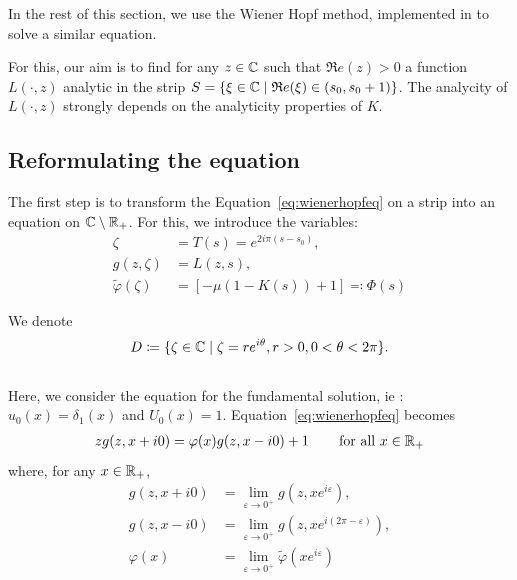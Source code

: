 \documentclass[11pt]{amsart}
\renewcommand{\Re}{\mathfrak{R}e}
\begin{document}
In the rest of this section, we use the Wiener Hopf method, implemented in \cite{escobedo2007fundamental} to solve a similar equation. 
\medskip

For this, our aim is to find for any $z \in \mathbb{C}$ such that $\Re(z) > 0$ a function $L(\cdot,z)$ analytic in the strip $S = \{\xi \in \CC \mid \Re(\xi) \in (s_0, s_0+1)\}$. 
The analycity of $L(\cdot,z)$ strongly depends on the analyticity properties of $K$.\\



\subsection{Reformulating the equation}

The first step is to transform the Equation~\eqref{eq:wienerhopfeq} on a strip into an equation on $\mathbb{C} \setminus \mathbb{R}_+$. For this, we introduce the variables:
    \begin{align}
        \zeta &= T(s) = e^{2i\pi(s-s_0)},\\
        g(z,\zeta) &= L(z,s), \\
        \tilde \varphi(\zeta) &= \left[- \mu (1-K(s)) + 1\right] \eqqcolon 
        \Phi(s)
    \end{align}

We denote 
\begin{equation}\label{def:D}
D \coloneqq \{ \zeta \in \mathbb{C} \mid \zeta = re^{i\theta}, r > 0, 0 < \theta < 2\pi \}.
\end{equation}\\

Here, we consider the equation for the fundamental solution, ie : $u_0(x) = \delta_1(x)$ and $U_0(x) = 1$. Equation~\eqref{eq:wienerhopfeq} becomes
\begin{align}
    \label{eq:WH3.5}
    z g(z, x+i0) = \varphi(x)g(z, x-i0) + 1 \, \qquad \text{for all $x\in\mathbb{R}_+$}
\end{align}
where, for any $x \in \mathbb{R}_+$, 
\begin{align*}
    g(z, x+i0) &= \lim_{\varepsilon\to 0^+}  g(z, xe^{i\varepsilon}),\\
    g(z, x-i0) &= \lim_{\varepsilon\to 0^+}  g(z, xe^{i(2\pi-\varepsilon)}),\\
    \varphi(x) &= \lim_{\varepsilon\to 0^+}\tilde \varphi(xe^{i\varepsilon}) 
\end{align*}
\end{document}
